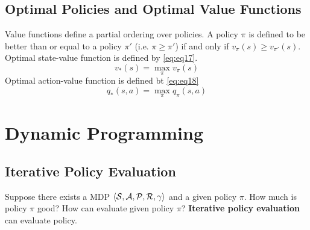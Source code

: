 \documentclass[
	10pt, %
]{article}
\newcommand{\mc}[1]{\mathcal{#1}}
\newcommand{\tb}[1]{\textbf{#1}}
\begin{document}
\subsection{Optimal Policies and Optimal Value Functions}
Value functions define a partial ordering over policies. A policy $\pi$ is defined to be better than or equal to a policy $\pi'$ (i.e. $\pi \geq \pi'$) if and only if $v_\pi(s) \geq v_{\pi'}(s)$.
Optimal state-value function is defined by \cref{eq:eq17}.
\begin{equation} \label{eq:eq17}
    v_*(s) = \max_{\pi} v_\pi(s)
\end{equation}
Optimal action-value function is defined bt \cref{eq:eq18}
\begin{equation} \label{eq:eq18}
    q_*(s,a) = \max_\pi q_\pi(s,a)
\end{equation}
\newpage



\section{Dynamic Programming}
\subsection{Iterative Policy Evaluation}
Suppose there exists a MDP $\braket{\mc{S,A,P,R}, \gamma}$ and a given policy $\pi$. How much is policy $\pi$ good? How can evaluate given policy $\pi$? \tb{Iterative policy evaluation} can evaluate policy.
\end{document}
